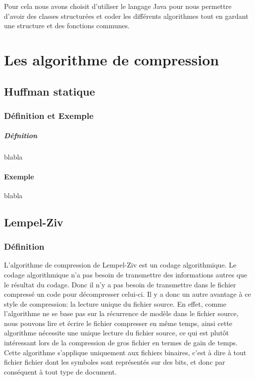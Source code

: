 \documentclass{report}
\begin{document}
Pour cela nous avons choisit d'utiliser le langage Java pour nous permettre d'avoir des classes structurées et coder les différents algorithmes tout en gardant une structure et des fonctions communes.
 
\part{Les algorithme de compression}
\chapter*{Huffman statique}
\section*{Définition et Exemple }
\subsubsection*{Défnition}
blabla 
\subsection*{Exemple}
blabla
\chapter*{Lempel-Ziv}
\section*{Définition }

L'algorithme de compression de Lempel-Ziv est un codage algorithmique.  Le codage algorithmique n’a pas besoin de transmettre des informations autres que le résultat du codage. Donc il n'y a pas besoin de transmettre dans le fichier compressé un code pour décompresser celui-ci. Il y a donc un autre avantage à ce style de compression: la lecture unique du fichier source. En effet, comme l'algorithme ne se base pas sur la récurrence de modèle dans le fichier source, nous pouvons lire et écrire le fichier compresser en même temps, ainsi cette algorithme nécessite une unique lecture du fichier source, ce qui est plutôt intéressant lors de la compression de gros fichier en termes de gain de temps. 
Cette algorithme s'applique uniquement aux fichiers binaires, c'est à dire à tout fichier fichier dont les symboles sont représentés sur des bits, et donc par conséquent à tout type de document. 
\end{document}
